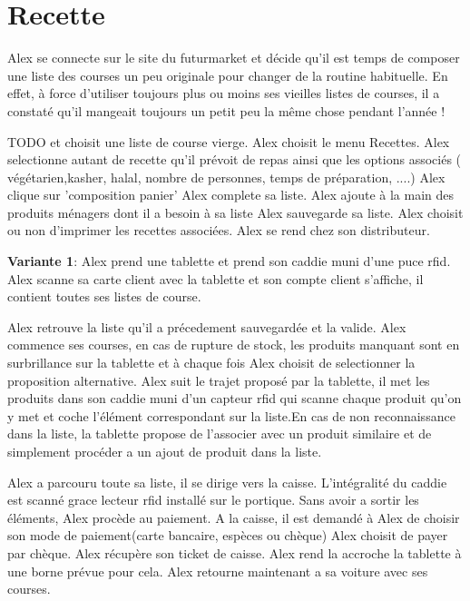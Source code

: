 \section{Recette}

Alex se connecte sur le site du futurmarket et décide qu'il est temps de composer une liste des courses un peu originale pour changer de la routine habituelle.
En effet, à force d'utiliser toujours plus ou moins ses vieilles listes de courses, il a constaté qu'il mangeait toujours un petit peu la même chose pendant l'année !\par
TODO
et choisit une liste de course vierge.
Alex choisit le menu Recettes.
Alex selectionne autant de recette qu'il prévoit de repas ainsi que les options associés ( végétarien,kasher, halal, nombre de personnes, temps de préparation, ....)
Alex clique sur 'composition panier'
Alex complete sa liste.
Alex ajoute à la main des produits ménagers dont il a besoin à sa liste
Alex sauvegarde sa liste.
Alex choisit ou non d'imprimer les recettes associées.
Alex se rend chez son distributeur.
\startitemize
\item {\bf Variante 1}:
Alex prend une tablette et prend son caddie muni d'une puce rfid.
Alex scanne sa carte client avec la tablette et son compte client s'affiche, il contient toutes ses listes de course.
\par
Alex retrouve la liste qu'il a précedement sauvegardée et la valide.
Alex commence ses courses, en cas de rupture de stock, les produits manquant sont en surbrillance sur la tablette et à chaque fois Alex choisit de selectionner la proposition alternative.
Alex suit le trajet proposé par la tablette, il met les produits dans son caddie muni d'un capteur rfid qui scanne chaque produit qu'on y met et coche l'élément correspondant sur la liste.En cas de non reconnaissance dans la liste, la tablette propose de l'associer avec un produit similaire et de simplement procéder a un ajout de produit dans la liste.
\par

Alex a parcouru toute sa liste, il se dirige vers la caisse. 
L'intégralité du caddie est scanné grace lecteur rfid installé sur le portique.
Sans avoir a sortir les éléments, Alex procède au paiement.
A la caisse, il est demandé à Alex de choisir son mode de paiement(carte bancaire, espèces ou chèque)
Alex choisit de payer par chèque. 
Alex récupère son ticket de caisse. 
Alex rend la accroche la tablette à une borne prévue pour cela.  
Alex retourne maintenant a sa voiture avec ses courses.

